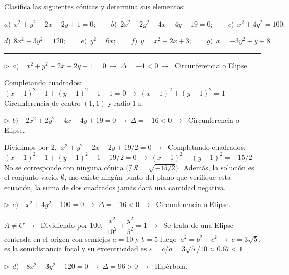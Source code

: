 \vspace{5mm}
\begin{miejercicio}

Clasifica las siguientes cónicas y determina sus elementos:

\vspace{2mm} $a)\ \ x^2+y^2-2x-2y+1=0;\qquad b)\ \ 2x^2+2y^2-4x-4y+19=0;\qquad c)	\ \ x^2+4y^2=100;$

\vspace{2mm} $d)\ \ 8x^2-3y^2=120;\qquad e)\ \ y^2=6x;\qquad f)\ \ y=x^2-2x+3;\qquad g)\ \ x=-3y^2+y+8$

\rule{250pt}{0.1pt}

\vspace{5mm} $\triangleright\ \ a) \quad  x^2+y^2-2x-2y+1=0 \ \to \ \Delta=-4<0\ \to \ $ Circunferencia o Elipse. 

\vspace{2mm} Completando cuadrados: $(x-1)^2-1+(y-1)^2-1+1=0 \ \to \ (x-1)^2+(y-1)^2=1\quad $ Circunferencia de centro $(1,1)$ y radio $1\, \mathrm{u}$.


\vspace{5mm} $\triangleright\ \ b) \quad 2x^2+2y^2-4x-4y+19=0 \ \to \ \Delta= -16<0 \ \to \ $ Circunferencia o Elipse. 

\vspace{2mm}  Dividimos por $2,\ \ x^2+y^2-2x-2y+19/2=0 \ \to \ $  Completando cuadrados: $ (x-1)^2-1+(y-1)^2-1+19/2=0 \ \to \ (x-1)^2+(y-1)^2=-15/2\quad$ No se corresponde con ninguna cónica \textcolor{gris}{$\big(\nexists \mathcal R=\sqrt{-15/2}\big)\ \ $ Además, la solución es el conjunto vacío, $\emptyset$, mo existe ningún punto del plano que verifique esta ecuación, la suma de dos cuadrados jamás dará una cantidad negativa. }.

\vspace{5mm} $\triangleright\ \ c) \quad x^2+4y^2-100=0\ \to \ \Delta=-16<0 \ \to \  $  Circunferencia o Elipse. 

\vspace{2mm} $A\neq C \ \to \  $ Dividiendo por 100, $\ \dfrac{x^2}{10^2}+\dfrac{y^2}{5^2}=1 \ \to \ $ Se trata de una Elipse centrada en el origen con semiejes $a=10$ y $b=5$ luego $\ a^2=b^2+c^2 \ \to \ c=3\sqrt{5}$, es la semidistancia focal y su excentricidad es $\varepsilon =c/a=3\sqrt{5}/10 \approx 0.67<1$

\vspace{5mm} $\triangleright\ \ d) \quad 8x^2-3y^2-120=0\ \to \ \Delta=96>0 \ \to \ $ Hipérbola.  


\end{miejercicio}
